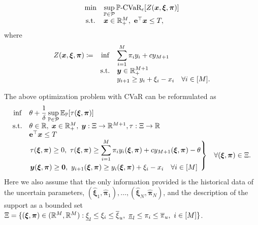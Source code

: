 \documentclass{article}
\newcommand{\st}{\textnormal{s.t.}}
\newcommand{\PP}{\mathbb{P}}
\newcommand{\EE}{\mathbb{E}}
\newcommand{\RR}{\mathbb{R}}
\begin{document}
\begin{equation*}
\begin{array}{clll}
  \displaystyle \text{min} & \displaystyle \sup_{\PP\in\mathcal P} \PP\text{-CVaR}_\epsilon[Z(\bm x, \bm \xi, \bm \pi)] \\
  \st & \bm x \in \mathbb{R}^M_{+},\ \mathbf{e}^\top \bm x \leq T, \\
\end{array}
\end{equation*}
where  
\begin{equation*}
\begin{array}{ccll}
  \displaystyle Z(\bm x, \bm \xi, \bm \pi) \coloneqq & \displaystyle \text{inf} & \displaystyle \sum_{i=1}^{M} \pi_i y_i + c y_{M+1}\\
   & \st &\bm y \in \mathbb{R}^{M+1}_{+} \\
   & & y_{i+1} \geq y_i + \xi_i - x_i \quad \forall i \in [M]. \\
\end{array}
\end{equation*}

The above optimization problem with CVaR can be reformulated as
\begin{equation}
\label{exp:MS2}
\begin{array}{clll}
   \displaystyle \text{inf} & \displaystyle \theta + \frac{1}{\delta} \sup_{\PP\in\mathcal P}\EE_\PP [\tau(\bm \xi,\bm \pi)]  \\
   \st &\theta\in \mathbb{R},\;\bm x \in \mathbb{R}^M_{+},\;\bm y: \Xi \rightarrow \RR^{M+1}, \tau: \Xi \rightarrow \RR\\
   & \mathbf{e}^\top \bm x \leq T \\
   & \left.\begin{aligned}
   & \tau(\bm \xi, \bm \pi) \geq 0, \ \tau(\bm \xi, \bm \pi) \geq \sum_{i=1}^{M} \pi_i y_i(\bm \xi, \bm \pi) + c y_{M+1}(\bm \xi, \bm \pi) - \theta \\
   & \bm y(\bm \xi, \bm \pi) \geq \bm 0, \ y_{i+1}(\bm \xi, \bm \pi) \geq y_i(\bm \xi, \bm \pi)+ \xi_i - x_i \quad \forall i \in [M] \\
\end{aligned} \right\} & \forall(\bm \xi, \bm \pi) \in \Xi.
\end{array}
\end{equation}
Here we also assume that the only information provided is the historical data of the uncertain parameters, $(\hat{\bm \xi}_1, \hat{\bm \pi}_1),\dots,(\hat{\bm \xi}_N, \hat{\bm \pi}_N)$, and the description of the support as a bounded set $ \Xi= \{ (\bm \xi, \bm \pi) \in (\RR^{M},\RR^{M}) :\linebreak \underline{\xi}_l \leq \xi_i \leq \overline{\xi}_u,\ \underline{\pi}_l \leq \pi_{i} \leq \overline{\pi}_u,\ i \in [M]\} $.
\end{document}
